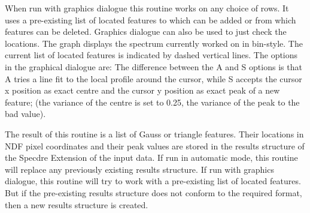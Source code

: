 {{      When run with graphics dialogue this routine works on any choice
      of rows. It uses a pre-existing list of located features to which
      can be added or from which features can be deleted. Graphics
      dialogue can also be used to just check the locations. The graph
      displays the spectrum currently worked on in bin-style. The current
      list of located features is indicated by dashed vertical lines.
      The options in the graphical dialogue are:
      The difference between the A and S options is that A tries a line
      fit to the local profile around the cursor, while S accepts the
      cursor x position as exact centre and the cursor y position as
      exact peak of a new feature; (the variance of the centre is set
      to 0.25, the variance of the peak to the bad value).

      The result of this routine is a list of Gauss or triangle
      features. Their locations in NDF pixel coordinates and their peak
      values are stored in the results structure of the Specdre
      Extension of the input data. If run in automatic mode, this
      routine will replace any previously existing results structure. If
      run with graphics dialogue, this routine will try to work with a
      pre-existing list of located features. But if the pre-existing
      results structure does not conform to the required format, then a
      new results structure is created.

}}

